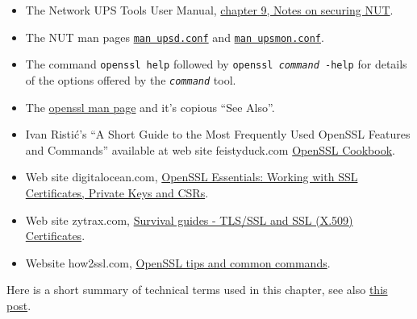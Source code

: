 \documentclass[12pt]{article}
\newcommand{\NUTman}[1]{\href{https://networkupstools.org/docs/man/#1.html}{\texttt{man #1}}}
\newcommand{\ul}{\begin{itemize}%
   \setlength{\itemsep}{0em}}
\newcommand{\eul}{\end{itemize}}
\newcommand{\li}{\item}                 %
\begin{document}
\ul

\li The Network UPS Tools User Manual,
  \href{https://networkupstools.org/docs/user-manual.chunked/ar01s09.html}%
       {chapter 9, Notes on securing NUT}.

\li The NUT man pages \NUTman{upsd.conf} and \NUTman{upsmon.conf}.

\li The command \texttt{openssl help} followed by \texttt{openssl
  \textsl{command} -help} for details of the options offered by the
\texttt{\textsl{command}} tool.

\li The \href{https://linux.die.net/man/1/openssl}%
             {openssl man page} and it's copious ``See Also''. 
       
\li Ivan Risti\'{c}'s ``A Short Guide to the Most Frequently Used OpenSSL
Features and Commands'' available at web site feistyduck.com
\href{https://www.feistyduck.com/library/openssl-cookbook/online/}%
     {OpenSSL Cookbook}.

\li Web site digitalocean.com,
     \href{https://www.digitalocean.com/community/tutorials/openssl-essentials-working-with-ssl-certificates-private-keys-and-csrs}%
     {OpenSSL Essentials: Working with SSL Certificates, Private Keys and CSRs}.

\li Web site zytrax.com, 
  \href{http://www.zytrax.com/tech/survival/ssl.html}%
       {Survival guides - TLS/SSL and SSL (X.509) Certificates}.

\li Website how2ssl.com, 
\href{http://how2ssl.com/articles/openssl\_commands\_and\_tips/}%
     {OpenSSL tips and common commands}.

\eul
       
Here is a short summary of technical terms used in this chapter, see also
\href{https://serverfault.com/questions/9708/what-is-a-pem-file-and-how-does-it-differ-from-other-openssl-generated-key-file}%
     {this post}.
\end{document}
